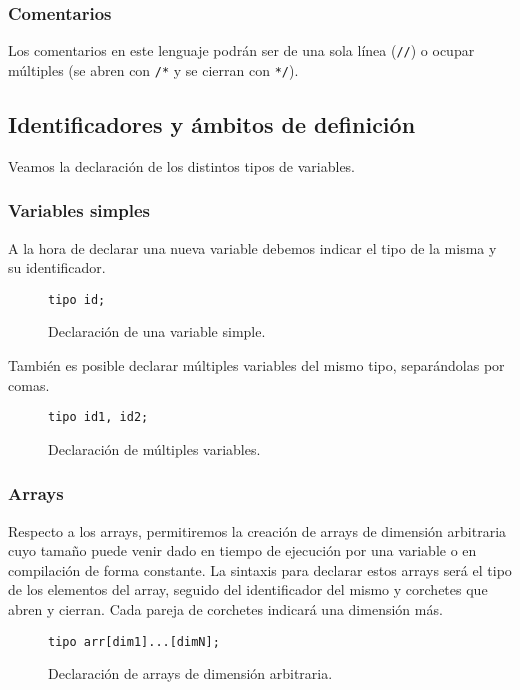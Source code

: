\subsubsection{Comentarios}
Los comentarios en este lenguaje podrán ser de una sola línea (\lstinline{//}) o
ocupar múltiples (se abren con \lstinline{/*} y se cierran con \lstinline{*/}).

\subsection{Identificadores y ámbitos de definición}
Veamos la declaración de los distintos tipos de variables.
\subsubsection{Variables simples}
A la hora de declarar una nueva variable debemos indicar el tipo de la misma y
su identificador.
\begin{figure}[htbp]
    \centering
    \begin{lstlisting}
tipo id;
    \end{lstlisting}
    \caption{Declaración de una variable simple.}
\end{figure}
También es posible declarar múltiples variables del mismo tipo, separándolas por
comas.
\begin{figure}[htbp]
    \centering
    \begin{lstlisting}
tipo id1, id2;
    \end{lstlisting}
    \caption{Declaración de múltiples variables.}
\end{figure}


\subsubsection{Arrays}
Respecto a los arrays, permitiremos la creación de arrays de dimensión
arbitraria cuyo tamaño puede venir dado en tiempo de ejecución por una variable
o en compilación de forma constante. La sintaxis para declarar estos arrays será
el tipo de los elementos del array, seguido del identificador del mismo y
corchetes que abren y cierran. Cada pareja de corchetes indicará una dimensión
más.
\begin{figure}[htbp]
    \centering
    \begin{lstlisting}
tipo arr[dim1]...[dimN];
    \end{lstlisting}
    \caption{Declaración de arrays de dimensión arbitraria.}
\end{figure}

